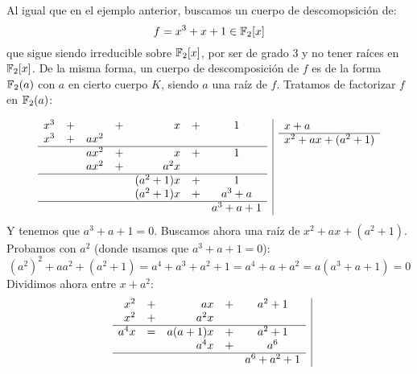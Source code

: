 \begin{ejemplo}
    Al igual que en el ejemplo anterior, buscamos un cuerpo de descomopsición de:
    \begin{equation*}
        f = x^3+x+1 \in \mathbb{F}_2[x]
    \end{equation*}
    que sigue siendo irreducible sobre $\mathbb{F}_2[x]$, por ser de grado 3 y no tener raíces en $\mathbb{F}_2[x]$. De la misma forma, un cuerpo de descomposición de $f$ es de la forma $\mathbb{F}_2(a)$ con $a$ en cierto cuerpo $K$, siendo $a$ una raíz de $f$. Tratamos de factorizar $f$ en $\mathbb{F}_2(a)$:

    \begin{equation*}
        \begin{array}{r|c}
            \begin{array}{rcrcrcc}
                x^3&+&&+&x&+&1 \\
                x^3&+&ax^2 && &&\\
                \hline
                   &&ax^2&+&x&+&1  \\
                   &&ax^2&+&a^2x&& \\
                   \hline
                   &&&&(a^2 +1)x &+&1 \\
                   &&&&(a^2+1)x &+&a^3 + a \\
                   \hline
                   &&&&&& a^3 + a + 1
            \end{array} & 
            \begin{array}{l}
                x+a \\
                \hline
                x^2+ax+(a^2+1) \\ \\ \\ \\ \\ \\
            \end{array}
        \end{array}
    \end{equation*}
    Y tenemos que $a^3+a+1 = 0$. Buscamos ahora una raíz de $x^2+ax+(a^2+1)$. Probamos con $a^2$ (donde usamos que $a^3 + a + 1 = 0$):
    \begin{equation*}
        {\left(a^2\right)}^{2}+ aa^2 + (a^2+1) = a^4 + a^3 + a^2 + 1 = a^4 + a + a^2 = a(a^3 + a + 1) = 0
    \end{equation*}
    Dividimos ahora entre $x+a^2$:
    \begin{equation*}
        \begin{array}{r|c}
            \begin{array}{rcrcc}
                x^2 &+& ax &+& a^2 +1 \\
                x^2 &+& a^2 x && \\
                \hline
                     a^4x &=& a(a+1)x &+& a^2 + 1 \\
                          && a^4x &+& a^6 \\
                          \hline
                          &&&& a^6+a^2 +1


\end{array}
\end{array}
\end{equation*}
\end{ejemplo}
